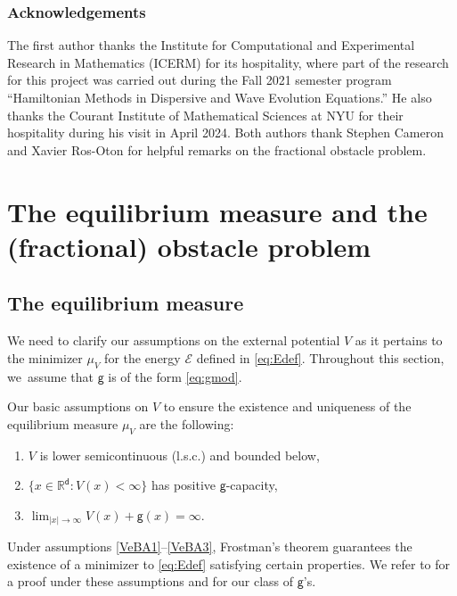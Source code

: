 \documentclass[10pt]{amsart}
\newenvironment{enumeratei}
{\bgroup\def\theenumi{\roman{enumi}}\def\theenumii{\arabic{enumii}}\begin{enumerate}}
{\end{enumerate}\egroup}
\theoremstyle{plain}
\theoremstyle{definition}
\newcommand{\R}{{\mathbb{R}}}
\newcommand{\Ec}{\mathcal{E}}
\renewcommand{\d}{\mathsf{d}}
\newcommand{\g}{{\mathsf{g}}}
\begin{document}
\subsubsection*{Acknowledgements}
The first author thanks the Institute for Computational and Experimental Research in Mathematics (ICERM) for its hospitality, where part of the research for this project was carried out during the Fall 2021 semester program ``Hamiltonian Methods in Dispersive and Wave Evolution Equations.'' He also thanks the Courant Institute of Mathematical Sciences at NYU for their hospitality during his visit in April 2024.
Both authors thank Stephen Cameron and Xavier Ros-Oton for helpful remarks on the fractional obstacle problem.

\section{The equilibrium measure and the (fractional) obstacle problem}\label{sec:EMOP}

\subsection{The equilibrium measure}\label{ssec:EMOPem}
We need to clarify our assumptions on the external potential $V$ as it pertains to the minimizer $\mu_V$ for the energy $\Ec$ defined in \eqref{eq:Edef}. Throughout this section, we~assume that $\g$ is of the form \eqref{eq:gmod}.

Our basic assumptions on $V$ to ensure the existence {and uniqueness} of the equilibrium measure $\mu_V$ are the following:
\begin{enumeratei}
\item\label{VeBA1} $V$ is lower semicontinuous (l.s.c.) and bounded below,
\item\label{VeBA2} $\{x\in\R^\d: V(x)<\infty\}$ has positive $\g$-capacity,
\item\label{VeBA3} {$\lim_{|x|\to\infty} V(x) +\g(x) = \infty$.}
\end{enumeratei}

Under assumptions \eqref{VeBA1}--\eqref{VeBA3}, Frostman's theorem \cite{Frostman1935} guarantees the existence of a minimizer to \eqref{eq:Edef} satisfying certain properties. {We refer to \cite[Chap.\,2]{SerfatyLN} for a proof under these assumptions and for our class of $\g$'s. }
\end{document}

